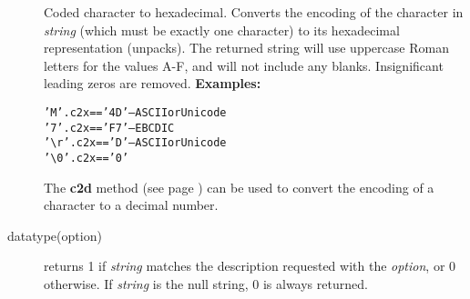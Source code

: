 \begin{description}
Coded character to hexadecimal.
Converts the encoding of the character in \emph{string} (which must be
exactly one character) to its hexadecimal representation (unpacks).
The returned string will use uppercase Roman letters for the values A-F,
and will not include any blanks.
Insignificant leading zeros are removed.
 \textbf{Examples:}
\begin{alltt}
'M'.c2x  == '4D' -- ASCII or Unicode
'7'.c2x  == 'F7' -- EBCDIC
'\textbackslash r'.c2x == 'D'  -- ASCII or Unicode
'\textbackslash 0'.c2x == '0'
\end{alltt}
 The  \textbf{c2d} method (see page \pageref{refc2d})  can be used to
convert the encoding of a character to a decimal number.
\item[datatype(option)]\label{refdataty}
\index{,}
\index{,}
\index{,}

returns 1 if \emph{string} matches the description requested with
the \emph{option}, or 0 otherwise.
If \emph{string} is the null string, 0 is always returned.
 

\end{description}
